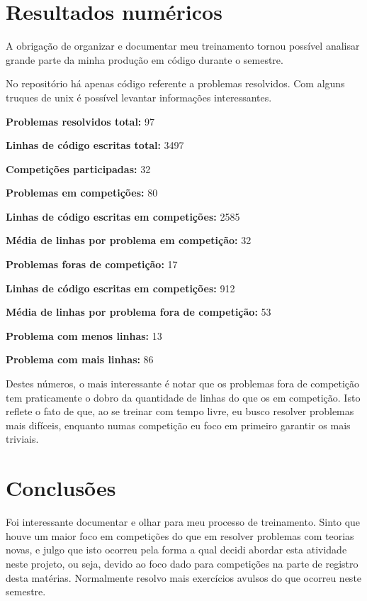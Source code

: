 \documentclass{article}
\begin{document}
\section{Resultados numéricos}

A obrigação de organizar e documentar meu treinamento tornou 
possível analisar grande parte da minha produção em código 
durante o semestre.

No repositório há apenas código referente a problemas resolvidos.
Com alguns truques de unix é possível levantar informações
interessantes.

\textbf{Problemas resolvidos total:} 97

\textbf{Linhas de código escritas total:} 3497

\textbf{Competições participadas:} 32

\textbf{Problemas em competições:} 80

\textbf{Linhas de código escritas em competições:} 2585

\textbf{Média de linhas por problema em competição:} 32

\textbf{Problemas foras de competição:} 17

\textbf{Linhas de código escritas em competições:} 912

\textbf{Média de linhas por problema  fora de competição:} 53

\textbf{Problema com menos linhas:} 13

\textbf{Problema com mais linhas:} 86

Destes números, o mais interessante é notar que os problemas fora
de competição tem praticamente o dobro da quantidade de linhas
do que os em competição. Isto reflete o fato de que, ao se treinar
com tempo livre, eu busco resolver problemas mais difíceis, enquanto
numas competição eu foco em primeiro garantir os mais triviais.

\section{Conclusões}

Foi interessante documentar e olhar para meu processo de treinamento.
Sinto que houve um maior foco em competições do que em resolver
problemas com teorias novas, e julgo que isto ocorreu pela forma
a qual decidi abordar esta atividade neste projeto, ou seja,
devido ao foco dado para competições na parte de registro desta
matérias. Normalmente resolvo mais exercícios avulsos do que ocorreu
neste semestre.
\end{document}

